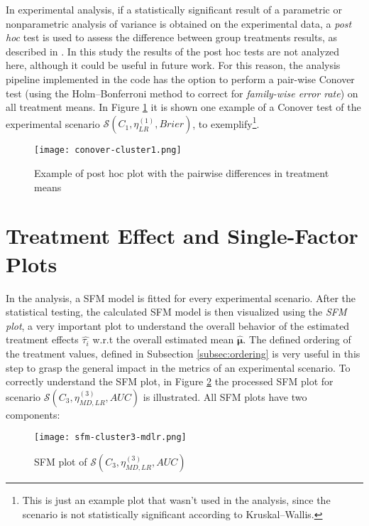 In experimental analysis, if a statistically significant result of a parametric or nonparametric analysis of variance is obtained on the experimental data, a \textit{post hoc} test is used to assess the difference between group treatments results, as described in \cite{Terpilowski2019}. In this study the results of the post hoc tests are not analyzed here, although it could be useful in future work. For this reason, the analysis pipeline implemented in the code has the option to perform a pair-wise Conover test (using the Holm–Bonferroni method to correct for \textit{family-wise error rate}) on all treatment means. In Figure \ref{fig:posthoc-conover} it is shown one example of a Conover test of the experimental scenario $\mathcal{S}(C_1, \eta^{(1)}_{LR}, Brier)$, to exemplify\footnote{This is just an example plot that wasn't used in the analysis, since the scenario is not statistically significant according to Kruskal–Wallis.}.

\begin{figure}[H]
    \centering
    \texttt{[image: conover-cluster1.png]} 
    \caption{Example of post hoc plot with the pairwise differences in treatment means}
    \label{fig:posthoc-conover}
\end{figure}

\section{Treatment Effect and Single-Factor Plots}

In the analysis, a SFM model is fitted for every experimental scenario. After the statistical testing, the calculated SFM model is then visualized using the \textit{SFM plot}, a very important plot to understand the overall behavior of the estimated treatment effects $\hat{\tau_i}$ w.r.t the overall estimated mean $\hat{\bm{\mu}}$. The defined ordering of the treatment values, defined in Subsection \ref{subsec:ordering} is very useful in this step to grasp the general impact in the metrics of an experimental scenario. To correctly understand the SFM plot, in Figure \ref{fig:sfm-plot-c3-mdlr} the processed SFM plot for scenario $\mathcal{S}(C_3, \eta^{(3)}_{MD, LR}, AUC)$ is illustrated. All SFM plots have two components:

\begin{figure}[H]
    \centering
    \texttt{[image: sfm-cluster3-mdlr.png]} 
    \caption{SFM plot of  $\mathcal{S}(C_3, \eta^{(3)}_{MD, LR}, AUC)$}
    \label{fig:sfm-plot-c3-mdlr}
\end{figure}


